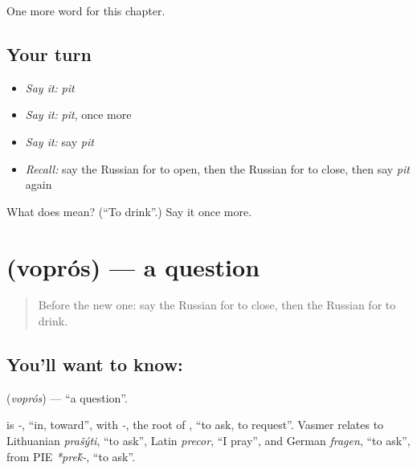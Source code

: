 \begin{grammarlens}[title={What you've built}]
One more word for this chapter.
\end{grammarlens}

\subsection*{Your turn}
\begin{itemize}
\raggedright
  \item \emph{Say it:} \emph{pit}
  \item \emph{Say it:} \emph{pit}, once more
  \item \emph{Say it:} say \emph{pit}
  \item \emph{Recall:} say the Russian for to open, then the Russian for to close, then say \emph{pit} again
\end{itemize}

\begin{tcolorbox}[breakable,colback=teal!4,colframe=teal!35!black,title={Before you move on}]
What does  mean? (\textquotedblleft{}To drink\textquotedblright{}.) Say it once more.
\end{tcolorbox}
\section[\texorpdfstring{\ru{вопрос} (voprós)}{вопрос (voprós)}]{ (voprós) — a question}

\label{lesson:RU-C42-question}



\begin{quote}
Before the new one: say the Russian for to close, then the Russian for to drink.
\end{quote}

\subsection*{You'll want to know: }
\textbf{} (\emph{voprós}) — \textquotedblleft{}a question\textquotedblright{}.

\begin{cousinweb}
\textbf{} is \emph{-}, \textquotedblleft{}in, toward\textquotedblright{}, with \emph{-}, the root of \emph{}, \textquotedblleft{}to ask, to request\textquotedblright{}. Vasmer relates \emph{} to Lithuanian \emph{prašýti}, \textquotedblleft{}to ask\textquotedblright{}, Latin \emph{precor}, \textquotedblleft{}I pray\textquotedblright{}, and German \emph{fragen}, \textquotedblleft{}to ask\textquotedblright{}, from PIE \emph{*pre\'{k}-}, \textquotedblleft{}to ask\textquotedblright{}.
\end{cousinweb}

